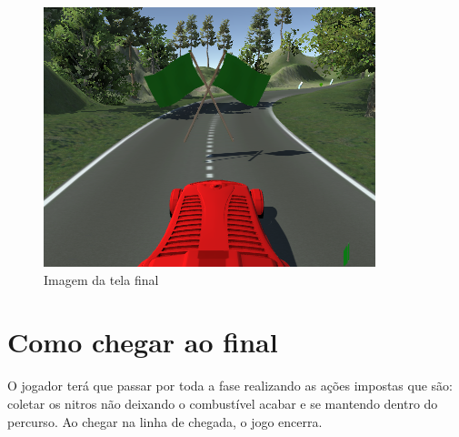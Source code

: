 \begin{figure}[!h]
	\centering
		\includegraphics[scale=0.5]{figuras/final}
	\caption{Imagem da tela final}
\end{figure}

\section{Como chegar ao final}

O jogador terá que passar por toda a fase realizando as ações impostas que são: coletar os nitros não deixando o combustível acabar e se mantendo dentro do percurso. Ao chegar na linha de chegada, o jogo encerra.